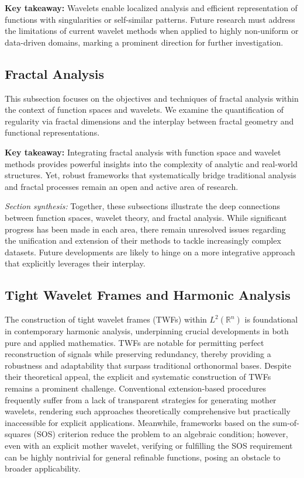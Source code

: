 \documentclass[sigconf]{acmart}
\begin{document}
\textbf{Key takeaway:} Wavelets enable localized analysis and efficient representation of functions with singularities or self-similar patterns. Future research must address the limitations of current wavelet methods when applied to highly non-uniform or data-driven domains, marking a prominent direction for further investigation.

\subsection{Fractal Analysis}

This subsection focuses on the objectives and techniques of fractal analysis within the context of function spaces and wavelets. We examine the quantification of regularity via fractal dimensions and the interplay between fractal geometry and functional representations.

\textbf{Key takeaway:} Integrating fractal analysis with function space and wavelet methods provides powerful insights into the complexity of analytic and real-world structures. Yet, robust frameworks that systematically bridge traditional analysis and fractal processes remain an open and active area of research.

\vspace{1em}

\noindent
\textit{Section synthesis:} Together, these subsections illustrate the deep connections between function spaces, wavelet theory, and fractal analysis. While significant progress has been made in each area, there remain unresolved issues regarding the unification and extension of their methods to tackle increasingly complex datasets. Future developments are likely to hinge on a more integrative approach that explicitly leverages their interplay.

\subsection{Tight Wavelet Frames and Harmonic Analysis}

The construction of tight wavelet frames (TWFs) within $L^2(\mathbb{R}^n)$ is foundational in contemporary harmonic analysis, underpinning crucial developments in both pure and applied mathematics. TWFs are notable for permitting perfect reconstruction of signals while preserving redundancy, thereby providing a robustness and adaptability that surpass traditional orthonormal bases. Despite their theoretical appeal, the explicit and systematic construction of TWFs remains a prominent challenge. Conventional extension-based procedures frequently suffer from a lack of transparent strategies for generating mother wavelets, rendering such approaches theoretically comprehensive but practically inaccessible for explicit applications. Meanwhile, frameworks based on the sum-of-squares (SOS) criterion reduce the problem to an algebraic condition; however, even with an explicit mother wavelet, verifying or fulfilling the SOS requirement can be highly nontrivial for general refinable functions, posing an obstacle to broader applicability.
\end{document}
